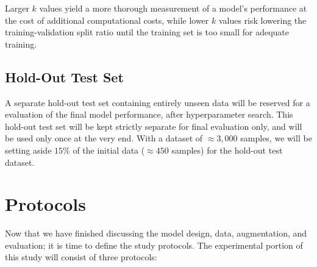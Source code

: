 



\noindent
Larger \(k\) values yield a more thorough measurement of a model's performance at the cost of additional computational costs, while lower \(k\) values risk lowering the training-validation split ratio until the training set is too small for adequate training. 

\subsection{Hold-Out Test Set}\label{sec:holdout-test-set}
A separate hold-out test set containing entirely unseen data will be reserved for a evaluation of the final model performance, after hyperparameter search. This hold-out test set will be kept strictly separate for final evaluation only, and will be used only once at the very end. With a dataset of \(\approx3,000\) samples, we will be setting aside \(15\%\) of the initial data (\(\approx450\) samples) for the hold-out test dataset.

\clearpage

\section{Protocols}\label{sec:protocols}

Now that we have finished discussing the model design, data, augmentation, and evaluation; it is time to define the study protocols. The experimental portion of this study will consist of three protocols:

